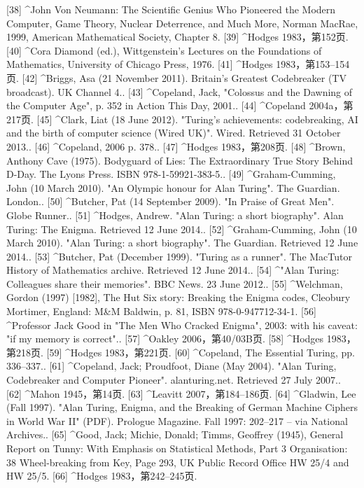 [38]
^John Von Neumann: The Scientific Genius Who Pioneered the Modern Computer, Game Theory, Nuclear Deterrence, and Much More, Norman MacRae, 1999, American Mathematical Society, Chapter 8.
[39]
^Hodges 1983，第152页.
[40]
^Cora Diamond (ed.), Wittgenstein's Lectures on the Foundations of Mathematics, University of Chicago Press, 1976.
[41]
^Hodges 1983，第153–154页.
[42]
^Briggs, Asa (21 November 2011). Britain's Greatest Codebreaker (TV broadcast). UK Channel 4..
[43]
^Copeland, Jack, "Colossus and the Dawning of the Computer Age", p. 352 in Action This Day, 2001..
[44]
^Copeland 2004a，第217页.
[45]
^Clark, Liat (18 June 2012). "Turing's achievements: codebreaking, AI and the birth of computer science (Wired UK)". Wired. Retrieved 31 October 2013..
[46]
^Copeland, 2006 p. 378..
[47]
^Hodges 1983，第208页.
[48]
^Brown, Anthony Cave (1975). Bodyguard of Lies: The Extraordinary True Story Behind D-Day. The Lyons Press. ISBN 978-1-59921-383-5..
[49]
^Graham-Cumming, John (10 March 2010). "An Olympic honour for Alan Turing". The Guardian. London..
[50]
^Butcher, Pat (14 September 2009). "In Praise of Great Men". Globe Runner..
[51]
^Hodges, Andrew. "Alan Turing: a short biography". Alan Turing: The Enigma. Retrieved 12 June 2014..
[52]
^Graham-Cumming, John (10 March 2010). "Alan Turing: a short biography". The Guardian. Retrieved 12 June 2014..
[53]
^Butcher, Pat (December 1999). "Turing as a runner". The MacTutor History of Mathematics archive. Retrieved 12 June 2014..
[54]
^"Alan Turing: Colleagues share their memories". BBC News. 23 June 2012..
[55]
^Welchman, Gordon (1997) [1982], The Hut Six story: Breaking the Enigma codes, Cleobury Mortimer, England: M&M Baldwin, p. 81, ISBN 978-0-947712-34-1.
[56]
^Professor Jack Good in "The Men Who Cracked Enigma", 2003: with his caveat: "if my memory is correct"..
[57]
^Oakley 2006，第40/03B页.
[58]
^Hodges 1983，第218页.
[59]
^Hodges 1983，第221页.
[60]
^Copeland, The Essential Turing, pp. 336–337..
[61]
^Copeland, Jack; Proudfoot, Diane (May 2004). "Alan Turing, Codebreaker and Computer Pioneer". alanturing.net. Retrieved 27 July 2007..
[62]
^Mahon 1945，第14页.
[63]
^Leavitt 2007，第184–186页.
[64]
^Gladwin, Lee (Fall 1997). "Alan Turing, Enigma, and the Breaking of German Machine Ciphers in World War II" (PDF). Prologue Magazine. Fall 1997: 202–217 – via National Archives..
[65]
^Good, Jack; Michie, Donald; Timms, Geoffrey (1945), General Report on Tunny: With Emphasis on Statistical Methods, Part 3 Organisation: 38 Wheel-breaking from Key, Page 293, UK Public Record Office HW 25/4 and HW 25/5.
[66]
^Hodges 1983，第242–245页.
